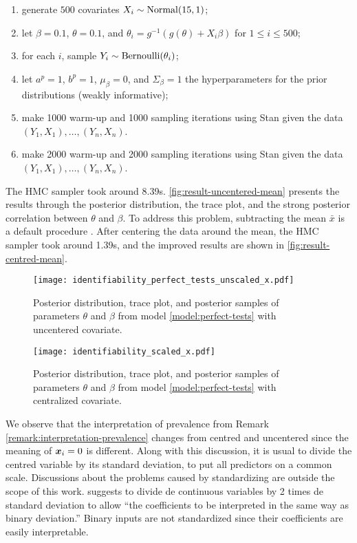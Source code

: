 \begin{enumerate}[label=(\roman*)]
  \item generate $500$ covariates $X_i \sim \operatorname{Normal}(15, 1)$;
  \item let $\beta = 0.1$, $\theta = 0.1$, and $\theta_i = g^{-1}(g(\theta) +
  X_i\beta)$ for $1 \le i \le 500$;
  \item for each $i$, sample $Y_i \sim \operatorname{Bernoulli}(\theta_i)$;
  \item let $a^p = 1$, $b^p = 1$, $\mu_{\beta} = 0$, and $\Sigma_{\beta} = 1$
  the hyperparameters for the prior distributions (weakly informative);
  \item make 1000 warm-up and 1000 sampling iterations using Stan given the
  data $(Y_1, X_1), \dots, (Y_n, X_n)$.  
  \item make 2000 warm-up and 2000 sampling iterations using Stan given the
  data $(Y_1, X_1), \dots, (Y_n, X_n)$.
\end{enumerate}

The HMC sampler took around 8.39s.
\autoref{fig:result-uncentered-mean} presents the results through the posterior
distribution, the trace plot, and the strong posterior
correlation between $\theta$ and $\beta$. To address this 
problem, subtracting the mean $\bar{x}$ is a default procedure \cite[p.
5]{ogle2020ensuring}. After centering the data around the mean, the HMC
sampler took around 1.39s, and the improved results are shown in
\autoref{fig:result-centred-mean}. 

\begin{figure}
  \centering  
  \caption{\label{fig:result-uncentered-mean}Posterior
  distribution, trace plot, and posterior samples of parameters 
  $\theta$ and $\beta$ from model \eqref{model:perfect-tests} with uncentered covariate.}
  \texttt{[image: identifiability\_perfect\_tests\_unscaled\_x.pdf]}
\end{figure} 

\begin{figure}
  \centering  
  \caption{\label{fig:result-centred-mean}Posterior
  distribution, trace plot, and posterior samples of parameters 
  $\theta$ and $\beta$ from model \eqref{model:perfect-tests} with centralized covariate.}
  \texttt{[image: identifiability\_scaled\_x.pdf]}
\end{figure} 

We observe that the interpretation of prevalence from Remark
\ref{remark:interpretation-prevalence} changes from centred and 
uncentered since the meaning of $\boldsymbol{x}_i = 0$ is different. Along with this
discussion, it is usual to divide the centred variable by its
standard deviation, to put all predictors on a common scale. Discussions about
the problems caused by standardizing are outside the scope of this work. 
\textcite{gelman2008scaling} suggests to divide de continuous variables by 2
times de standard deviation to allow ``the coefficients to be interpreted in
the same way as binary deviation.'' \cite[p. 2867]{gelman2008scaling} Binary
inputs are not standardized since their coefficients are easily interpretable.

